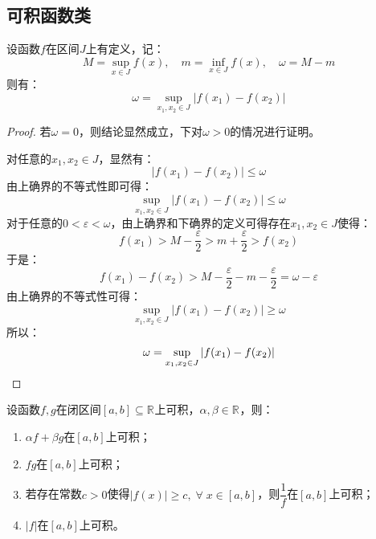 \subsection{可积函数类}
\begin{lemma}\label{lem:omega=SupVari}
	设函数$f$在区间$J$上有定义，记：
	\begin{equation*}
		M=\sup_{x\in J}f(x),\quad m=\inf_{x\in J}f(x),\quad\omega=M-m
	\end{equation*}
	则有：
	\begin{equation*}
		\omega=\sup_{x_1,x_2\in J}|f(x_1)-f(x_2)|
	\end{equation*}
\end{lemma}
\begin{proof}
	若$\omega=0$，则结论显然成立，下对$\omega>0$的情况进行证明。\par
	对任意的$x_1,x_2\in J$，显然有：
	\begin{equation*}
		|f(x_1)-f(x_2)|\leqslant\omega
	\end{equation*}
	由上确界的不等式性即可得：
	\begin{equation*}
		\sup_{x_1,x_2\in J}|f(x_1)-f(x_2)|\leqslant\omega
	\end{equation*}
	对于任意的$0<\varepsilon<\omega$，由上确界和下确界的定义可得存在$x_1,x_2\in J$使得：
	\begin{equation*}
		f(x_1)>M-\frac{\varepsilon}{2}>m+\frac{\varepsilon}{2}>f(x_2)
	\end{equation*}
	于是：
	\begin{equation*}
		f(x_1)-f(x_2)>M-\frac{\varepsilon}{2}-m-\frac{\varepsilon}{2}=\omega-\varepsilon
	\end{equation*}
	由上确界的不等式性可得：
	\begin{equation*}
		\sup_{x_1,x_2\in J}|f(x_1)-f(x_2)|\geqslant\omega
	\end{equation*}
	所以：
	\begin{equation*}
		\omega=\sup_{x_1,x_2\in J}|f(x_1)-f(x_2)|\qedhere
	\end{equation*}
\end{proof}
\begin{theorem}
	设函数$f,g$在闭区间$[a,b]\subseteq\mathbb{R}^{}$上可积，$\alpha,\beta\in\mathbb{R}^{}$，则：
	\begin{enumerate}
		\item $\alpha f+\beta g$在$[a,b]$上可积；
		\item $fg$在$[a,b]$上可积；
		\item 若存在常数$c>0$使得$|f(x)|\geqslant c,\;\forall\;x\in[a,b]$，则$\dfrac{1}{f}$在$[a,b]$上可积；
		\item $|f|$在$[a,b]$上可积。
	\end{enumerate}
\end{theorem}
